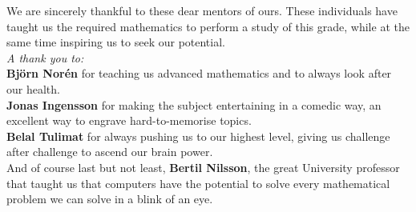 \documentclass[main.tex]{subfiles}
\begin{document}
We are sincerely thankful to these dear mentors of ours. These individuals have
taught us the required mathematics to perform a study of this grade, while at
the same time inspiring us to seek our potential. \\

\emph{A thank you to:} \\

\textbf{Björn Norén} for teaching us advanced mathematics and to always
look after our health. \\

\textbf{Jonas Ingensson} for making the subject entertaining in a
comedic way, an excellent way to engrave hard-to-memorise topics. \\

\textbf{Belal Tulimat} for always pushing us to our highest level, giving us
challenge after challenge to ascend our brain power. \\

And of course last but not least, \textbf{Bertil Nilsson}, the great University
professor that taught us that computers have the potential to
solve every mathematical problem we can solve in a blink of an eye. \\
\end{document}
